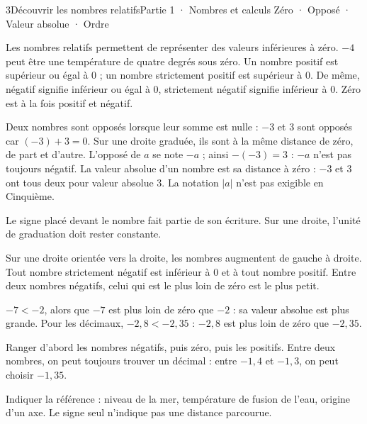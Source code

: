 \begin{ouverture}[calcul]{3}{Découvrir les nombres relatifs}{Partie 1 · Nombres et calculs}
{Zéro · Opposé · Valeur absolue · Ordre}
\end{ouverture}
\pagestyle{otMain}\essentiel\fontsize{11}{15}\selectfont
{}\label{cours-3-1}
\begin{definition}Les nombres relatifs permettent de représenter des valeurs inférieures à zéro. $-4$ peut être une température de quatre degrés sous zéro. Un nombre positif est supérieur ou égal à 0 ; un nombre strictement positif est supérieur à 0. De même, négatif signifie inférieur ou égal à 0, strictement négatif signifie inférieur à 0. Zéro est à la fois positif et négatif.\end{definition}
\begin{definition}Deux nombres sont opposés lorsque leur somme est nulle : $-3$ et $3$ sont opposés car $(-3)+3=0$. Sur une droite graduée, ils sont à la même distance de zéro, de part et d’autre. L’opposé de $a$ se note $-a$ ; ainsi $-(-3)=3$ : $-a$ n’est pas toujours négatif. La valeur absolue d’un nombre est sa distance à zéro : $-3$ et $3$ ont tous deux pour valeur absolue 3. La notation $\lvert a\rvert$ n’est pas exigible en Cinquième.\end{definition}
\label{fig-cours-3-1-cours-relatifs}

\begin{attention}Le signe placé devant le nombre fait partie de son écriture. Sur une droite, l’unité de graduation doit rester constante.\end{attention}
\clearpage
{}\label{cours-3-2}
\begin{propriete}Sur une droite orientée vers la droite, les nombres augmentent de gauche à droite. Tout nombre strictement négatif est inférieur à 0 et à tout nombre positif. Entre deux nombres négatifs, celui qui est le plus loin de zéro est le plus petit.\end{propriete}
\begin{exemple}$-7<-2$, alors que $-7$ est plus loin de zéro que $-2$ : sa valeur absolue est plus grande. Pour les décimaux, $-2{,}8<-2{,}35$ : $-2{,}8$ est plus loin de zéro que $-2{,}35$.\end{exemple}
\begin{savoirfaire}Ranger d’abord les nombres négatifs, puis zéro, puis les positifs. Entre deux nombres, on peut toujours trouver un décimal : entre $-1{,}4$ et $-1{,}3$, on peut choisir $-1{,}35$.\end{savoirfaire}
\begin{savoirfaire}Indiquer la référence : niveau de la mer, température de fusion de l’eau, origine d’un axe. Le signe seul n’indique pas une distance parcourue.\end{savoirfaire}

